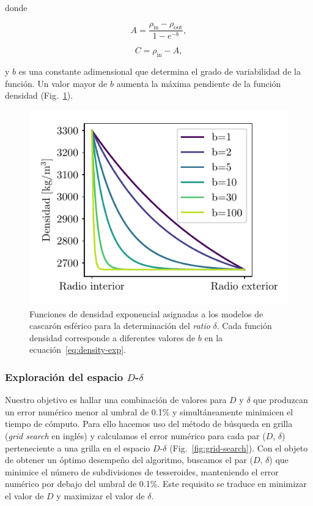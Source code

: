 \noindent donde

\begin{equation}
    A = \frac{\rho_\text{in} - \rho_\text{out}}{1 - e^{-b}},
\end{equation}

\begin{equation}
    C = \rho_\text{in} - A,
\end{equation}

\noindent y $b$ es una constante adimensional que determina el grado de
variabilidad de la función. Un valor mayor de $b$ aumenta la máxima pendiente
de la función densidad (Fig.~\ref{fig:exp-densities}).

\begin{figure}
\centering
\includegraphics[width=0.5\linewidth]{figs/tesseroids-variable-density/exponential-densities.pdf}
\caption{
    Funciones de densidad exponencial asignadas a los modelos de cascarón
    esférico para la determinación del \emph{ratio} $\delta$.
    Cada función densidad corresponde a diferentes valores de $b$ en la
    ecuación~\ref{eq:density-exp}.
}
\label{fig:exp-densities}
\end{figure}


\subsubsection{Exploración del espacio $D$-$\delta$}

Nuestro objetivo es hallar una combinación de valores para $D$ y $\delta$ que
produzcan un error numérico menor al umbral de 0.1\% y simultáneamente
minimicen el tiempo de cómputo.
Para ello hacemos uso del método de búsqueda en grilla (\emph{grid search} en
inglés) y calculamos el error numérico para cada par ($D$, $\delta$)
perteneciente a una grilla en el espacio $D$-$\delta$
(Fig.~\ref{fig:grid-search}).
Con el objeto de obtener un óptimo desempeño del algoritmo, buscamos el par
($D$, $\delta$) que minimice el número de subdivisiones de tesseroides,
manteniendo el error numérico por debajo del umbral de 0.1\%.
Este requisito se traduce en minimizar el valor de $D$ y maximizar el valor de
$\delta$.

